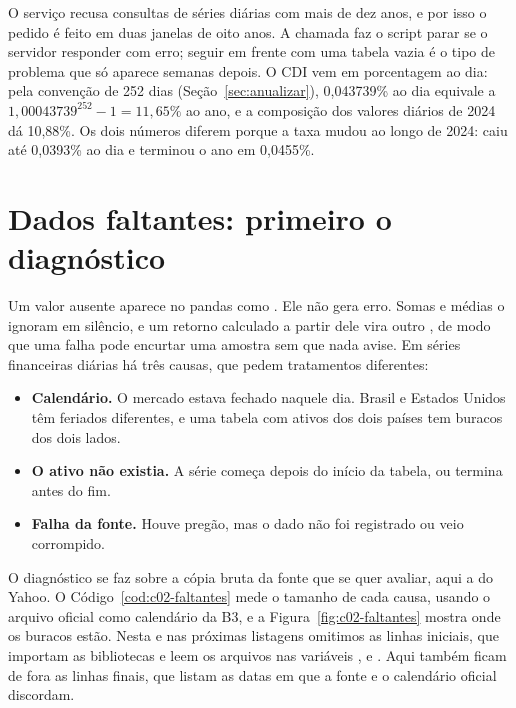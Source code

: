 O serviço recusa consultas de séries diárias com mais de dez anos, e por isso o pedido é feito em duas janelas de oito anos. A chamada  faz o script parar se o servidor responder com erro; seguir em frente com uma tabela vazia é o tipo de problema que só aparece semanas depois. O CDI vem em porcentagem ao dia: pela convenção de 252 dias (Seção~\ref{sec:anualizar}), 0,043739\% ao dia equivale a $1,00043739^{252} - 1 = 11,65\%$ ao ano, e a composição dos valores diários de 2024 dá 10,88\%. Os dois números diferem porque a taxa mudou ao longo de 2024: caiu até 0,0393\% ao dia e terminou o ano em 0,0455\%.

\section{Dados faltantes: primeiro o diagnóstico}
\label{sec:c02-faltantes}

Um valor ausente aparece no pandas como . Ele não gera erro. Somas e médias o ignoram em silêncio, e um retorno calculado a partir dele vira outro , de modo que uma falha pode encurtar uma amostra sem que nada avise. Em séries financeiras diárias há três causas, que pedem tratamentos diferentes:


\begin{itemize}
  \item \textbf{Calendário.} O mercado estava fechado naquele dia. Brasil e Estados Unidos têm feriados diferentes, e uma tabela com ativos dos dois países tem buracos dos dois lados.
  \item \textbf{O ativo não existia.} A série começa depois do início da tabela, ou termina antes do fim.
  \item \textbf{Falha da fonte.} Houve pregão, mas o dado não foi registrado ou veio corrompido.
\end{itemize}

O diagnóstico se faz sobre a cópia bruta da fonte que se quer avaliar, aqui a do Yahoo. O Código~\ref{cod:c02-faltantes} mede o tamanho de cada causa, usando o arquivo oficial como calendário da B3, e a Figura~\ref{fig:c02-faltantes} mostra onde os buracos estão. Nesta e nas próximas listagens omitimos as linhas iniciais, que importam as bibliotecas e leem os arquivos nas variáveis ,  e . Aqui também ficam de fora as linhas finais, que listam as datas em que a fonte e o calendário oficial discordam.

